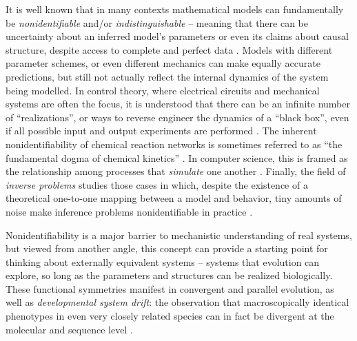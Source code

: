 \documentclass{article}
\newcommand{\1}{\mathbbm{1}}
\begin{document}
It is well known that in many contexts mathematical models
can fundamentally be \emph{nonidentifiable} and/or \emph{indistinguishable} -- meaning that 
there can be uncertainty about an inferred model's parameters or even its claims about
causal structure, despite access to complete and perfect data \citep{bellman1970structural, grewal1976identifiability, walter1984structural}. 
Models with different parameter schemes, or even different mechanics 
can make equally accurate predictions,
but still not actually reflect the internal dynamics of the system being modelled.
In control theory, where electrical circuits and mechanical systems are often the focus, 
it is understood that there can be an infinite number of ``realizations'', 
or ways to reverse engineer the dynamics of a ``black box'',
even if all possible input and output experiments are performed 
\citep{kalman1963mathematical, anderson1966equivalence, zadeh1976linear}. 
The inherent nonidentifiability of chemical reaction networks is sometimes referred to as ``the fundamental dogma of chemical kinetics'' \citep{craciun2008identifiability}. 
In computer science, this is framed as the relationship among processes that \emph{simulate} one another \citep{van2004equivalence}.
Finally,
the field of \emph{inverse problems} studies those cases in which,
despite the existence of a theoretical one-to-one mapping between a model and behavior,
tiny amounts of noise make inference problems nonidentifiable in practice \citep{petrov2005well}.

Nonidentifiability is a major barrier to mechanistic understanding of real systems, 
but viewed from another angle,
this concept can provide a starting point for thinking about externally equivalent systems
-- systems that evolution can explore, so long as the parameters and structures can be realized biologically.
These functional symmetries manifest in convergent and parallel evolution, 
as well as \emph{developmental system drift}: the observation that
macroscopically identical phenotypes in even very closely related species can in fact be divergent at the molecular and sequence level 
\citep{kimura1981possibility, true2001developmental, tanay2005conservation, tsong2006evolution, hare2008sepsid, lavoie2010evolutionary, vierstra2014mouse, matsui2015regulatory, dalal2016transcriptional, dalal2017transcription}.
\end{document}
